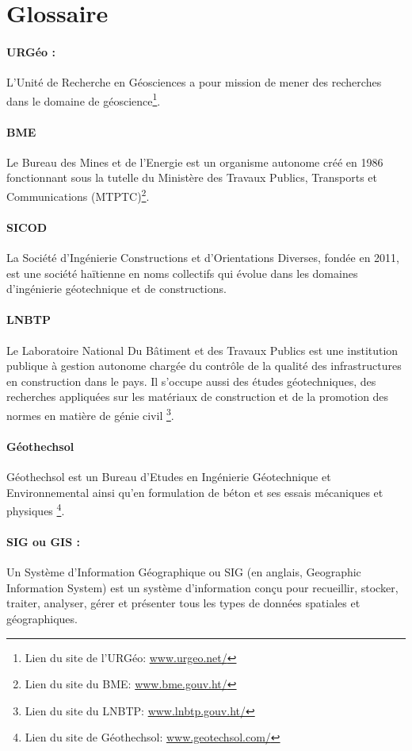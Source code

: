 \section{Glossaire}
\paragraph{URGéo :}
L'Unité de Recherche en Géosciences a pour mission de mener des
recherches dans le domaine de géoscience\footnote{Lien du site de l'URGéo: \url{www.urgeo.net/}}.




\paragraph{BME}
Le Bureau des Mines et de l’Energie est un organisme autonome créé en 
1986 fonctionnant sous la tutelle du Ministère des Travaux Publics, Transports 
et Communications (MTPTC)\footnote{Lien du site du BME: \url{www.bme.gouv.ht/}}. 


\paragraph{SICOD}
La  Société d’Ingénierie Constructions et d’Orientations Diverses,
fondée en 2011, est une société haïtienne en noms collectifs qui évolue dans 
les domaines d’ingénierie géotechnique et de constructions.

\paragraph{LNBTP}
Le Laboratoire National Du Bâtiment et des Travaux Publics est une institution 
publique à gestion autonome chargée du contrôle de
la qualité des infrastructures en construction dans le pays. Il s'occupe 
aussi des études géotechniques, des recherches appliquées sur les matériaux de 
construction et de la promotion des normes en matière de génie civil
\footnote{Lien du site du LNBTP: \url{www.lnbtp.gouv.ht/}}. 


\paragraph{Géothechsol}
Géothechsol est un Bureau d’Etudes 
en Ingénierie Géotechni\-que et Environnemental
ainsi qu’en formulation de béton et ses essais mécani\-ques et physiques
\footnote{Lien du site de Géothechsol: \url{www.geotechsol.com/}}.  

\paragraph{SIG ou GIS :}  
Un Système d'Information Géographique ou SIG (en anglais, Geographic 
Information System) est un système d'information conçu pour 
recueillir, stocker, traiter, analyser, gérer et présenter tous les 
types de données spatiales et géographiques. 


